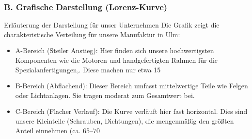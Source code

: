 \documentclass[12pt, a4paper]{article}
\begin{document}
\subsubsection{B. Grafische Darstellung (Lorenz-Kurve)}

\pgfplotsset{compat=1.18}

Erläuterung der Darstellung für unser Unternehmen \newline
Die Grafik zeigt die charakteristische Verteilung für unsere Manufaktur in Ulm:
\begin{itemize}
    \item A-Bereich (Steiler Anstieg): Hier finden sich unsere hochwertigsten Komponenten wie die Motoren und handgefertigten Rahmen für die Spezialanfertigungen,. Diese machen nur etwa 15 %
    \item B-Bereich (Abflachend): Dieser Bereich umfasst mittelwertige Teile wie Felgen oder Lichtanlagen. Sie tragen moderat zum Gesamtwert bei.
    \item C-Bereich (Flacher Verlauf): Die Kurve verläuft hier fast horizontal. Dies sind unsere Kleinteile (Schrauben, Dichtungen), die mengenmäßig den größten Anteil einnehmen (ca. 65–70 %
\end{itemize}
\end{document}
